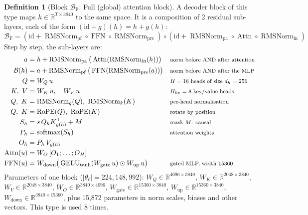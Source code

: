 \documentclass[10pt,a4paper]{article}
\newcommand{\op}[1]{\operatorname{#1}}
\theoremstyle{definition}
\newtheorem{definition}{Definition}[section]
\begin{document}
\begin{definition}[Block $\mathcal{B}_{\mathrm{F}}$: Full (global) attention block]
A decoder block of this type maps $h\in\mathbb{R}^{T\times 3840}$ to the same space. It is a composition of 2 residual sub-layers, each of the form $(\mathrm{id}+g)(h)=h+g(h)$:
\begin{equation}
  \mathcal{B}_{\mathrm{F}} = (\mathrm{id}+\op{RMSNorm}_{\mathrm{pf}}\circ\op{FFN}\circ \op{RMSNorm}_{\mathrm{pre}})\circ(\mathrm{id}+\op{RMSNorm}_{\mathrm{pa}}\circ \op{Attn}\circ \op{RMSNorm}_{\mathrm{in}})
\end{equation}
Step by step, the sub-layers are:
\begin{align*}
  a &= h + \op{RMSNorm}_{\mathrm{pa}}\big(\op{Attn}(\op{RMSNorm}_{\mathrm{in}}(h))\big) && \text{\footnotesize norm before AND after attention} \\
  \mathcal{B}(h) &= a + \op{RMSNorm}_{\mathrm{pf}}\big(\op{FFN}(\op{RMSNorm}_{\mathrm{pre}}(a))\big) && \text{\footnotesize norm before AND after the MLP} \\
  Q &= W_Q\,u && \text{\footnotesize $H=16$ heads of size $d_h=256$} \\
  K,\ V &= W_K\,u,\quad W_V\,u && \text{\footnotesize $H_{kv}=8$ key/value heads} \\
  Q,\ K &= \op{RMSNorm}_q(Q),\ \op{RMSNorm}_k(K) && \text{\footnotesize per-head normalisation} \\
  Q,\ K &= \op{RoPE}(Q),\ \op{RoPE}(K) && \text{\footnotesize rotate by position} \\
  S_h &= s\, Q_h K_{g(h)}^{\top} + M && \text{\footnotesize mask $M$: causal} \\
  P_h &= \op{softmax}(S_h) && \text{\footnotesize attention weights} \\
  O_h &= P_h\, V_{g(h)} \\
  \op{Attn}(u) &= W_O\,[O_1;\dots;O_H] \\
  \op{FFN}(u) &= W_{\mathrm{down}}\big(\op{GELU}_{\tanh}(W_{\mathrm{gate}}\,u)\odot W_{\mathrm{up}}\,u\big) && \text{\footnotesize gated MLP, width 15360}
\end{align*}
Parameters of one block ($|\theta_\ell|=224{,}148{,}992$): $W_Q\in\mathbb{R}^{4096\times3840}$, $W_K\in\mathbb{R}^{2048\times3840}$, $W_V\in\mathbb{R}^{2048\times3840}$, $W_O\in\mathbb{R}^{3840\times4096}$, $W_{\mathrm{gate}}\in\mathbb{R}^{15360\times3840}$, $W_{\mathrm{up}}\in\mathbb{R}^{15360\times3840}$, $W_{\mathrm{down}}\in\mathbb{R}^{3840\times15360}$, plus 15,872 parameters in norm scales, biases and other vectors. This type is used 8 times.
\end{definition}
\end{document}
